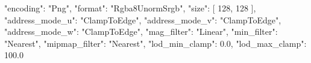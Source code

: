{
    "encoding": "Png",
    "format": "Rgba8UnormSrgb",
    "size": [
        128,
        128
    ],
    "address_mode_u": "ClampToEdge",
    "address_mode_v": "ClampToEdge",
    "address_mode_w": "ClampToEdge",
    "mag_filter": "Linear",
    "min_filter": "Nearest",
    "mipmap_filter": "Nearest",
    "lod_min_clamp": 0.0,
    "lod_max_clamp": 100.0
}
